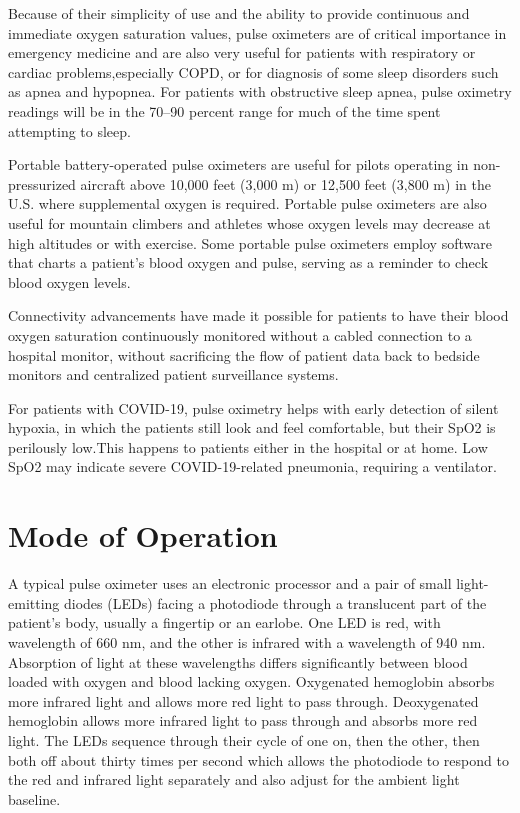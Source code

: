 \documentclass[12pt]{article}
\begin{document}
Because of their simplicity of use and the ability to provide continuous and immediate oxygen saturation values, pulse oximeters are of critical importance in emergency medicine and are also very useful for patients with respiratory or cardiac problems,especially COPD, or for diagnosis of some sleep disorders such as apnea and hypopnea. For patients with obstructive sleep apnea, pulse oximetry readings will be in the 70–90 percent range for much of the time spent attempting to sleep.

Portable battery-operated pulse oximeters are useful for pilots operating in non-pressurized aircraft above 10,000 feet (3,000 m) or 12,500 feet (3,800 m) in the U.S. where supplemental oxygen is required. Portable pulse oximeters are also useful for mountain climbers and athletes whose oxygen levels may decrease at high altitudes or with exercise. Some portable pulse oximeters employ software that charts a patient's blood oxygen and pulse, serving as a reminder to check blood oxygen levels.

Connectivity advancements have made it possible for patients to have their blood oxygen saturation continuously monitored without a cabled connection to a hospital monitor, without sacrificing the flow of patient data back to bedside monitors and centralized patient surveillance systems.

For patients with COVID-19, pulse oximetry helps with early detection of silent hypoxia, in which the patients still look and feel comfortable, but their SpO2 is perilously low.This happens to patients either in the hospital or at home. Low SpO2 may indicate severe COVID-19-related pneumonia, requiring a ventilator.


\section{Mode of Operation}
A typical pulse oximeter uses an electronic processor and a pair of small light-emitting diodes (LEDs) facing a photodiode through a translucent part of the patient's body, usually a fingertip or an earlobe. One LED is red, with wavelength of 660 nm, and the other is infrared with a wavelength of 940 nm. Absorption of light at these wavelengths differs significantly between blood loaded with oxygen and blood lacking oxygen. Oxygenated hemoglobin absorbs more infrared light and allows more red light to pass through. Deoxygenated hemoglobin allows more infrared light to pass through and absorbs more red light. The LEDs sequence through their cycle of one on, then the other, then both off about thirty times per second which allows the photodiode to respond to the red and infrared light separately and also adjust for the ambient light baseline.
\end{document}
